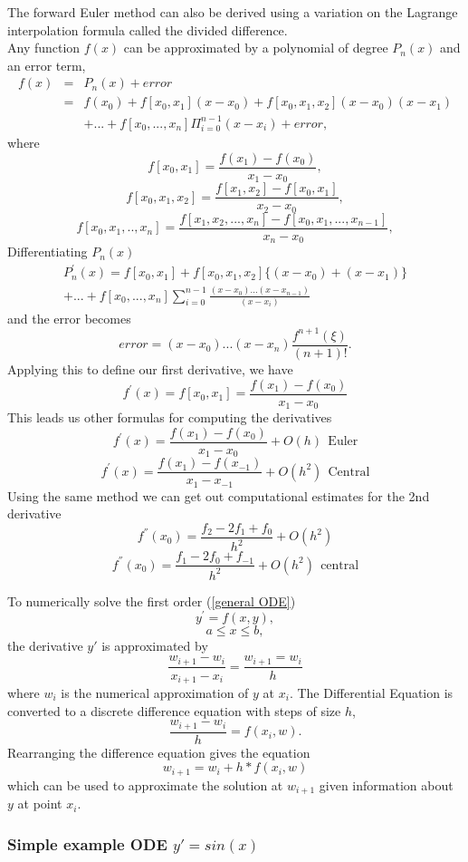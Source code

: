 The forward Euler method can also be derived using a variation on the Lagrange interpolation formula
called the divided difference. \\
Any function $f(x)$ can be approximated by a polynomial of degree $P_n(x)$ and an error term,
\begin{eqnarray*}
f(x)&=&P_n(x) + error\\
&=&f(x_0)+f[x_0,x_1](x-x_0)+f[x_0,x_1,x_2](x-x_0)(x-x_1)\\
& &+...+f[x_0,...,x_n]\Pi_{i=0}^{n-1}(x-x_i)+error,
\end{eqnarray*}
where 
\[f[x_0,x_1] = \frac{f(x_1)-f(x_0)}{x_1-x_0},\]
\[f[x_0,x_1,x_2] = \frac{f[x_1,x_2]-f[x_0,x_1]}{x_2-x_0},\]
\[f[x_0,x_1,..,x_n] = \frac{f[x_1,x_2,...,x_n]-f[x_0,x_1,...,x_{n-1}]}{x_n-x_0},\]
Differentiating $P_n(x)$
\begin{eqnarray*}
P_n^{'}(x)=f[x_0,x_1]+f[x_0,x_1,x_2]\{(x-x_0)+(x-x_1)\} \\
+...+f[x_0,...,x_n]\sum_{i=0}^{n-1}\frac{(x-x_0)...(x-x_{n-1})}{(x-x_i)}\end{eqnarray*}
and the error becomes
\[
error= (x-x_0)...(x-x_n)\frac{f^{n+1}(\xi)}{(n+1)!}.
\]
Applying this to define our first derivative, we have
\[
f^{'}(x)=f[x_0,x_1] = \frac{f(x_1)-f(x_0)}{x_1-x_0}\]
This leads us other formulas for computing the derivatives
\[ f^{'}(x) = \frac{f(x_1)-f(x_0)}{x_1-x_0}+O(h) \ \ \mbox{Euler}\]
\[ f^{'}(x) = \frac{f(x_1)-f(x_{-1})}{x_1-x_{-1}}+O(h^2) \ \ \mbox{Central}\]
Using the same method we can get out computational estimates for the 2nd 
derivative
\[f^{''}(x_0)=\frac{f_{2}-2f_1+f_0}{h^2}+O(h^2)\]
\[f^{''}(x_0)=\frac{f_{1}-2f_0+f_{-1}}{h^2}+O(h^2)\ \ \mbox{central}\]
\begin{example} To numerically solve the first order  (\ref{general ODE})
\[ y^{'} = f(x,y), \]
\[a\leq x \leq b, \]
the derivative $y{'}$ is approximated by \[\frac{w_{i+1}-w_{i}}{x_{i+1}-x_{i}}=\frac{w_{i+1}=w_{i}}{h}\]
where $w_i$ is the numerical approximation of $y$ at $x_i$.
The Differential Equation is converted to a discrete difference equation with steps of size $h$, 
\[\frac{w_{i+1}-w_i}{h}=f(x_i,w). \]
Rearranging the difference equation gives the equation 
\[w_{i+1}=w_i+h*f(x_i,w) \]
which can be used to approximate the solution at $w_{i+1}$ given information about $y$ at point $x_i$.
\end{example}

\subsubsection{Simple example ODE $y'=sin(x)$}

